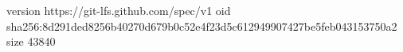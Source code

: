 version https://git-lfs.github.com/spec/v1
oid sha256:8d291ded8256b40270d679b0c52e4f23d5c612949907427be5feb043153750a2
size 43840
